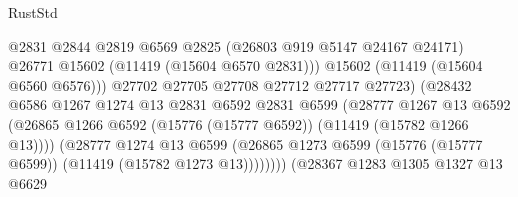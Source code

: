 \begin{lexlean}{RustStd}
\begin{coremodule}
                                              @2831
                                              @2844
                                              @2819
                                              @6569
                                              @2825
                                              (@26803 @919 @5147 @24167 @24171)
                                              @26771
                                              @15602
                                              (@11419 (@15604 @6570 @2831)))
                                            @15602
                                            (@11419 (@15604 @6560 @6576)))
                                          @27702
                                          @27705
                                          @27708
                                          @27712
                                          @27717
                                          @27723)
                                        (@28432
                                          @6586
                                          @1267
                                          @1274
                                          @13
                                          @2831
                                          @6592
                                          @2831
                                          @6599
                                          (@28777
                                            @1267
                                            @13
                                            @6592
                                            (@26865
                                              @1266
                                              @6592
                                              (@15776 (@15777 @6592))
                                              (@11419 (@15782 @1266 @13))))
                                          (@28777
                                            @1274
                                            @13
                                            @6599
                                            (@26865
                                              @1273
                                              @6599
                                              (@15776 (@15777 @6599))
                                              (@11419 (@15782 @1273 @13))))))))
                                  (@28367
                                    @1283
                                    @1305
                                    @1327
                                    @13
                                    @6629

\end{coremodule}
\end{lexlean}
